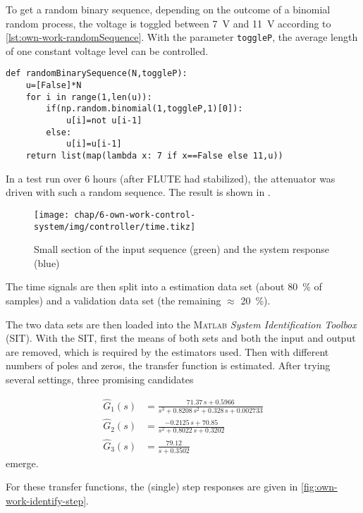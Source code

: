 To get a random binary sequence, depending on the outcome of a binomial random process, the voltage is toggled between \SI{7}{\volt} and \SI{11}{\volt} according to \autoref{lst:own-work-randomSequence}. With the parameter \texttt{toggleP}, the average length of one constant voltage level can be controlled.

\begin{lstlisting}[style=python,caption = Function to get a random binary sequence, label = lst:own-work-randomSequence]
def randomBinarySequence(N,toggleP):
    u=[False]*N
    for i in range(1,len(u)):
        if(np.random.binomial(1,toggleP,1)[0]):
            u[i]=not u[i-1]
        else:
            u[i]=u[i-1]
    return list(map(lambda x: 7 if x==False else 11,u))
\end{lstlisting}

In a test run over 6 hours (after FLUTE had stabilized), the attenuator was driven with such a random sequence. The result is shown in .

\begin{figure}[tb]
	\centering
	\texttt{[image: chap/6-own-work-control-system/img/controller/time.tikz]}
	\caption{Small section of the input sequence (green) and the system response (blue)}
	\label{fig:own-work-identify-input}
\end{figure}

The time signals are then split into a estimation data set (about \SI{80}{\percent} of samples) and a validation data set (the remaining $\approx$ \SI{20}{\percent}).

The two data sets are then loaded into the \textsc{Matlab} \textit{System Identification Toolbox} (SIT). With the SIT, first the means of both sets and both the input and output are removed, which is required by the estimators used. Then with different numbers of poles and zeros, the transfer function is estimated. After trying several settings, three promising candidates

\begin{align}
\hat{G}_1(s) &= \frac{71.37\,s + 0.5966}{s^3 + 0.8208\,s^2 + 0.328\,s + 0.002733} \\[1em]
\hat{G}_2(s) &= \frac{-0.2125\,s + 70.85}{s^2 + 0.8022\,s + 0.3202} \\[1em]
\hat{G}_3(s) &= \frac{79.12}{s + 0.3502}
\end{align}
emerge.

For these transfer functions, the (single) step responses are given in \autoref{fig:own-work-identify-step}.

